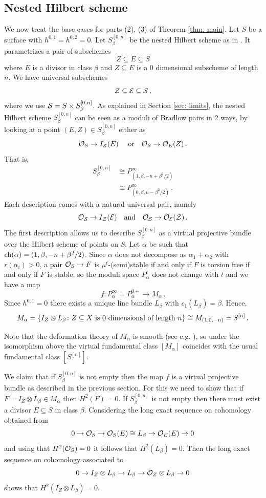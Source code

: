 \documentclass[a4paper, 12pt]{amsart}
\begin{document}
\subsection{Nested Hilbert scheme}
\label{sec: nestedhilbertscheme}
We now treat the base cases for parts (2), (3) of Theorem \ref{thm: main}. Let $S$ be a surface with $h^{0,1}=h^{0,2}=0$. Let $S_{\beta}^{[0,n]}$ be the nested Hilbert scheme as in \cite{gsy}. It parametrizes a pair of subschemes 
\[Z\subseteq E\subseteq S\]
where $E$ is a divisor in class $\beta$ and $Z\subseteq E$ is a 0 dimensional subscheme of length~$n$.
We have universal subschemes
\[{\mathcal Z}\subseteq {\mathcal E}\subseteq{\mathcal S}\,,\] 
where we use ${\mathcal S}=S\times S_\beta^{[0,n]}$. As explained in Section \ref{sec: limits}, the nested Hilbert scheme $S_{\beta}^{[0,n]}$ can be seen as a moduli of Bradlow pairs in 2 ways, by looking at a point $(E, Z)\in S_\beta^{[0,n]}$ either as
\[{\mathcal O}_S\to I_Z(E)\quad\textup{ or}\quad{\mathcal O}_S\to {\mathcal O}_E(Z)\,.\]
That is,
\begin{align*}S_{\beta}^{[0,n]}&\cong P_{\left(1,\beta, -n+\beta^2/2\right)}^\infty\\
&\cong P_{\left(0,\beta, n-\beta^2/2\right)}^\infty\,.
\end{align*}
Each description comes with a natural universal pair, namely
\[{\mathcal O}_{{\mathcal S}}\to I_{\mathcal Z}({\mathcal E})\quad\textup{and}\quad{\mathcal O}_{{\mathcal S}}\to {\mathcal O}_{\mathcal E}({\mathcal Z})\,.\]
The first description allows us to describe $S_\beta^{[0,n]}$ as a virtual projective bundle over the Hilbert scheme of points on $S$. Let $\alpha$ be such that $\mathrm{ch}(\alpha)=(1, \beta, -n+\beta^2/2)$. Since $\alpha$ does not decompose as $\alpha_1+\alpha_2$ with $r(\alpha_i)>0$, a pair ${\mathcal O}_S\to F$ is $\mu^t$-(semi)stable if and only if $F$ is torsion free if and only if $F$ is stable, so the moduli space $P^t_\alpha$ does not change with $t$ and we have a map
\[f\colon P_\alpha^\infty=P_\alpha^{0+}\to M_\alpha\,.\]
Since $h^{0,1}=0$ there exists a unique line bundle $L_\beta$ with $c_1(L_\beta)=\beta$. Hence,
\[M_\alpha=\{I_Z\otimes L_\beta\colon Z\subseteq X\textup{ is }0\textup{ dimensional of length }n\}\cong M_{(1,0,-n)}=S^{[n]}\,.\]

Note that the deformation theory of $M_{\alpha}$ is smooth (see e.g. \cite[Proposition 2.2]{EGL}), so under the isomorphism above the virtual fundamental class $[M_\alpha]$ coincides with the usual fundamental class $[S^{[n]}]$.

We claim that if $S_{\beta}^{[0,n]}$ is not empty then the map $f$ is a virtual projective bundle as described in the previous section. For this we need to show that if $F=I_Z\otimes L_\beta\in M_\alpha$ then $H^2(F)=0$. If $S_{\beta}^{[0,n]}$ is not empty then there must exist a divisor $E\subseteq S$ in class $\beta$. Considering the long exact sequence on cohomology obtained from
\[0\to {\mathcal O}_S\to {\mathcal O}_S(E)\cong L_\beta\to {\mathcal O}_E(E)\to 0\]
and using that $H^2({\mathcal O}_S)=0$ it follows that $H^2(L_\beta)=0$. Then the long exact sequence on cohomology associated to 
\[0\to I_Z\otimes L_\beta\to L_\beta\to {\mathcal O}_Z\otimes L_\beta\to 0\]
shows that $H^2(I_Z\otimes L_\beta)=0$. 
\end{document}
